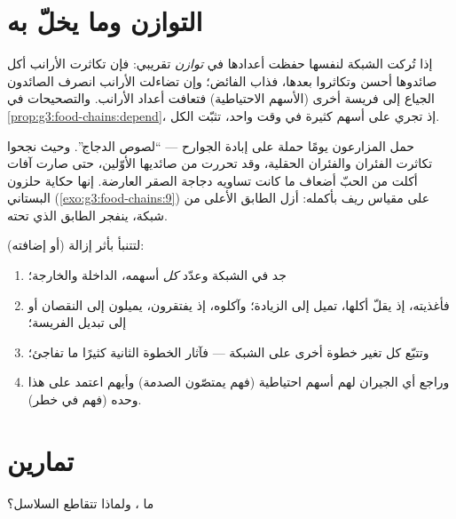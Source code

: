 \section{التوازن وما يخلّ به}

\begin{proposition}\label{prop:g5:food-webs:balance}
إذا تُركت الشبكة لنفسها حفظت أعدادها في \emph{توازن}
تقريبي: فإن تكاثرت الأرانب أكل صائدوها أحسن
وتكاثروا بعدها، فذاب الفائض؛ وإن تضاءلت الأرانب انصرف الصائدون
الجياع إلى فريسة أخرى (الأسهم الاحتياطية) فتعافت أعداد الأرانب.
والتصحيحات في \cref{prop:g3:food-chains:depend}، إذ تجري على أسهم
كثيرة في وقت واحد، تثبّت الكل.
\end{proposition}
\admitted

\begin{example}\label{ex:g5:food-webs:mistake}
حمل المزارعون يومًا حملة على إبادة الجوارح --- ``لصوص الدجاج''.
وحيث نجحوا تكاثرت الفئران والفئران الحقلية، وقد تحررت من صائديها
الأوّلين، حتى صارت آفات أكلت من الحبّ أضعاف ما كانت تساويه دجاجة
الصقر العارضة. إنها حكاية حلزون البستاني
(\cref{exo:g3:food-chains:9}) على مقياس ريف بأكمله: أزل الطابق
الأعلى من شبكة، ينفجر الطابق الذي تحته.
\end{example}

\begin{method}\label{met:g5:food-webs:predict}
لتتنبأ بأثر إزالة  (أو إضافته):
\begin{enumerate}
  \item جد  في الشبكة وعدّد \emph{كل} أسهمه، الداخلة
        والخارجة؛
  \item فأغذيته، إذ يقلّ أكلها، تميل إلى الزيادة؛ وآكلوه، إذ
        يفتقرون، يميلون إلى النقصان أو إلى تبديل الفريسة؛
  \item وتتبّع كل تغير خطوة أخرى على الشبكة --- فآثار الخطوة
        الثانية كثيرًا ما تفاجئ؛
  \item وراجع أي الجيران لهم أسهم احتياطية (فهم يمتصّون الصدمة)
        وأيهم اعتمد على هذا  وحده (فهم في خطر).
\end{enumerate}
\end{method}

\section{تمارين}

\begin{exercise}[$\star$]\label{exo:g5:food-webs:1}
ما ، ولماذا تتقاطع السلاسل؟
\end{exercise}

